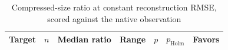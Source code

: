 \begin{table}[t]
\centering
\caption{Compressed-size ratio at constant reconstruction RMSE, scored against the native observation}
\label{tab:storage_at_rmse_common}
\footnotesize
\setlength{\tabcolsep}{3pt}
\begin{tabular}{lrrrrrl}
\toprule
Target & $n$ & Median ratio & Range & $p$ & $p_{\mathrm{Holm}}$ & Favors \\
\midrule
\bottomrule
\end{tabular}
\end{table}
